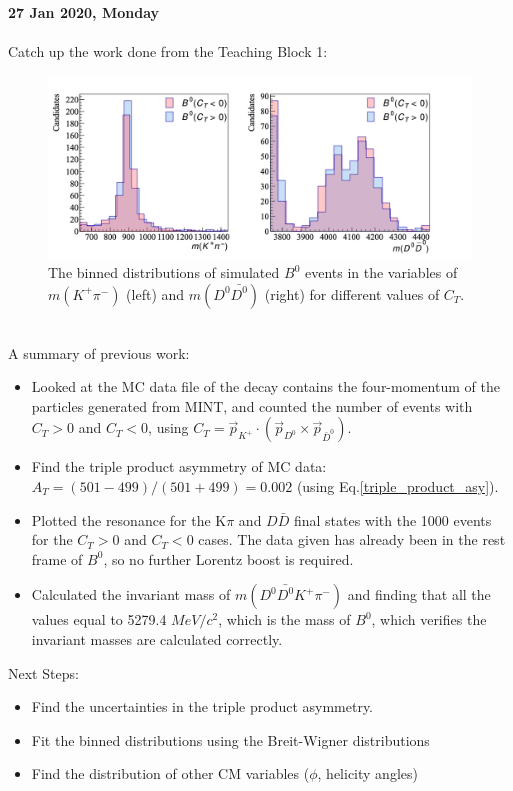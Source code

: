 \clearpage
\noindent\textbf{27 Jan 2020, Monday}
\\
\\
Catch up the work done from the Teaching Block 1:
\begin{figure}[h]
\center
\includegraphics*[width=0.96\linewidth]{CM_variables_B0/invmass_ini}
\caption{The binned distributions of simulated $B^0$ events in the variables of $m(K^+\pi^-)$ (left) and $m(D^0\bar{D^0})$ (right) for different values of $C_T$.}
\label{fig1}
\end{figure}
\\
A summary of previous work:
\begin{itemize}
    \item Looked at the MC data file of the decay contains the four-momentum of the particles generated from MINT, and counted the number of events with $C_T>0$ and $C_T<0$, using $C_T = \Vec{p}_{K^+}\cdot(\Vec{p}_{D^0} \times \Vec{p}_{\bar{D}^0})$.
    \item Find the triple product asymmetry of MC data: $A_T = (501-499)/(501+499) = 0.002$ (using Eq.\ref{triple_product_asy}).
    \item Plotted the resonance for the K$\pi$ and $D\bar{D}$ final states with the 1000 events for the $C_T > 0$ and $C_T < 0$ cases. The data given has already been in the rest frame of $B^0$, so no further Lorentz boost is required.

    \item Calculated the invariant mass of $m(D^0\bar{D^0}K^+\pi^-)$ and finding that all the values equal to 5279.4 $MeV/c^2$, which is the mass of $B^0$, which verifies the invariant masses are calculated correctly.
\end{itemize}
Next Steps:
\begin{itemize}
    \item Find the uncertainties in the triple product asymmetry.
    \item Fit the binned distributions using the Breit-Wigner distributions
    \item Find the distribution of other CM variables ($\phi$, helicity angles)
\end{itemize}
